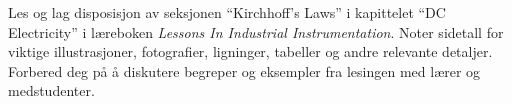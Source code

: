 

Les og lag disposisjon av seksjonen ``Kirchhoff's Laws'' i kapittelet ``DC Electricity'' i læreboken {\it Lessons In Industrial Instrumentation}. Noter sidetall for viktige illustrasjoner, fotografier, ligninger, tabeller og andre relevante detaljer. Forbered deg på å diskutere begreper og eksempler fra lesingen med lærer og medstudenter.















